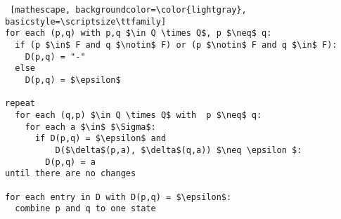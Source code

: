 \documentclass[
    border=0.2cm,
    convert={density=600}
]{standalone}
\begin{document}
\begin{lstlisting} [mathescape, backgroundcolor=\color{lightgray},
basicstyle=\scriptsize\ttfamily]
for each (p,q) with p,q $\in Q \times Q$, p $\neq$ q:
  if (p $\in$ F and q $\notin$ F) or (p $\notin$ F and q $\in$ F):
    D(p,q) = "-"
  else
    D(p,q) = $\epsilon$

repeat 
  for each (q,p) $\in Q \times Q$ with  p $\neq$ q:
    for each a $\in$ $\Sigma$:
      if D(p,q) = $\epsilon$ and
          D($\delta$(p,a), $\delta$(q,a)) $\neq \epsilon $:
        D(p,q) = a
until there are no changes

for each entry in D with D(p,q) = $\epsilon$:
  combine p and q to one state
\end{lstlisting}
\end{document}
